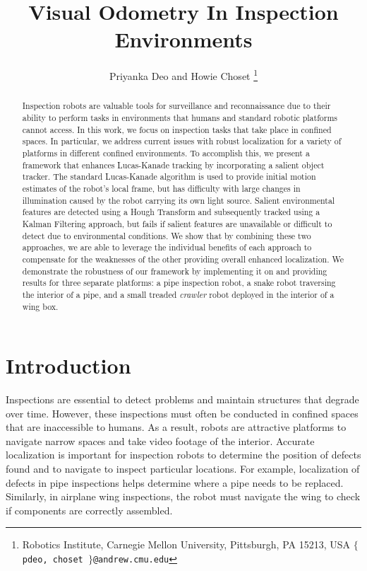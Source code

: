 \documentclass[letterpaper, 10 pt, conference]{ieeeconf}
\title{\LARGE \bf Visual Odometry In Inspection Environments}
\author{Priyanka Deo and Howie Choset%
\thanks{Robotics Institute,
Carnegie Mellon University,
Pittsburgh, PA 15213, USA
{\tt\small $\lbrace$ pdeo, choset $\rbrace$@andrew.cmu.edu}}%
}
\begin{document}
\maketitle
\thispagestyle{empty}
\pagestyle{empty}


\begin{abstract}

Inspection robots are valuable tools for surveillance and reconnaissance due to their ability to perform tasks in environments that humans and standard robotic platforms cannot access. In this work, we focus on inspection tasks that take place in confined spaces. In particular, we address current issues with robust localization for a variety of platforms in different confined environments. To accomplish this, we present a framework that enhances Lucas-Kanade tracking by incorporating a salient object tracker. The standard Lucas-Kanade algorithm is used to provide initial motion estimates of the robot's local frame, but has difficulty with large changes in illumination caused by the robot carrying its own light source. Salient environmental features are detected using a Hough Transform and subsequently tracked using a Kalman Filtering approach, but fails if salient features are unavailable or difficult to detect due to environmental conditions. We show that by combining these two approaches, we are able to leverage the individual benefits of each approach to compensate for the weaknesses of the other providing overall enhanced localization. We demonstrate the robustness of our framework by implementing it on and providing results for three separate platforms: a pipe inspection robot, a snake robot traversing the interior of a pipe, and a small treaded \emph{crawler} robot deployed in the interior of a wing box.

\end{abstract}


\section{Introduction}

Inspections are essential to detect problems and maintain structures that degrade over time. However, these inspections must often be conducted in confined spaces that are inaccessible to humans. As a result, robots are attractive platforms to navigate narrow spaces and take video footage of the interior. Accurate localization is important for inspection robots to determine the position of defects found and to navigate to inspect particular locations. For example, localization of defects in pipe inspections helps determine where a pipe needs to be replaced. Similarly, in airplane wing inspections, the robot must navigate the wing to check if components are correctly assembled. 
\end{document}
